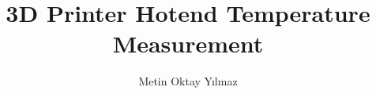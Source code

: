 \documentclass[12pt,a4paper]{article}
\title{3D Printer Hotend Temperature Measurement}
\author{Metin Oktay Yılmaz}
\begin{document}
    

    \tableofcontents
    \singlespacing
    \listoffigures
    \singlespacing
    \listoftables
    \singlespacing

    
    
    
    
    
    
    

    
    
\end{document}
